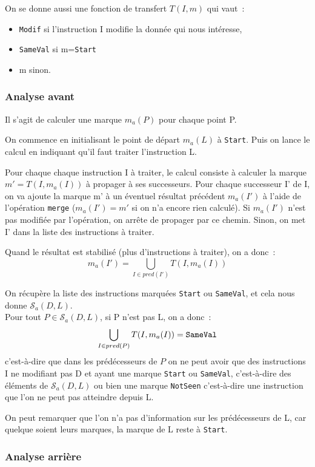 \documentclass[a4paper,twoside]{article}
\newcommand{\sca}{\mathcal{S}_a}
\begin{document}
On se donne aussi une fonction de transfert $T(I,m)$ qui vaut~:
\begin{itemize}
  \item {\tt Modif} si l'instruction I modifie la donnée qui nous intéresse,
  \item {\tt SameVal} si m={\tt Start}
  \item m sinon.
\end{itemize}

\subsubsection{Analyse avant}

Il s'agit de calculer une marque $m_a(P)$ pour chaque point P.

On commence en initialisant le point de départ $m_a(L)$ à {\tt Start}.
Puis on lance le calcul en indiquant qu'il faut traiter l'instruction L.

Pour chaque chaque instruction I à traiter, le calcul consiste à
calculer la marque $m' = T(I, m_a(I))$ à propager à ses successeurs.
Pour chaque successeur I' de I, on va ajoute la marque m'
à un éventuel résultat précédent $m_a(I')$
à l'aide de l'opération {\tt merge}
($m_a(I')=m'$ si on n'a encore rien calculé).
Si $m_a(I')$ n'est pas modifiée par l'opération, on arrête de propager par ce
chemin. Sinon, on met I' dans la liste des instructions à traiter.

Quand le résultat est stabilisé (plus d'instructions à traiter),
on a donc~:
$$
m_a(I') = \bigcup_{I \in pred(I')} T(I, m_a(I))
$$

On récupère la liste des instructions
marquées {\tt Start} ou {\tt SameVal}, et cela nous donne $\sca(D,L)$.\\

Pour tout $P \in \sca(D,L)$, si P n'est pas L, on a donc~:
$$
\bigcup_{I \in pred(P)} T(I, m_a(I)) = {\tt SameVal}
$$
c'est-à-dire que dans les prédécesseurs de $P$ on ne peut avoir que des
instructions I ne modifiant pas D et ayant une marque
{\tt Start} ou {\tt SameVal}, c'est-à-dire des éléments de $\sca(D,L)$
ou bien une marque {\tt NotSeen} c'est-à-dire une instruction que l'on ne peut
pas atteindre depuis L.

On peut remarquer que l'on n'a pas d'information sur les prédécesseurs de L,
car quelque soient leurs marques, la marque de L reste à  {\tt Start}.

\subsubsection{Analyse arrière}
\end{document}
